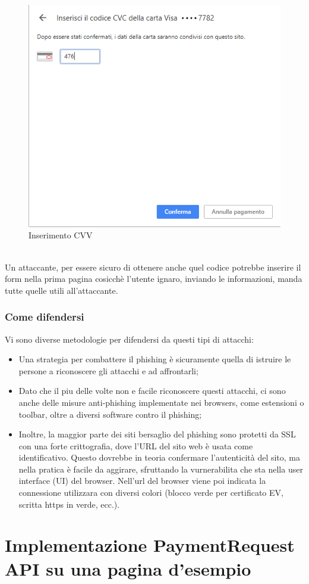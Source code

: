 \documentclass[11pt ,a4paper , twoside , openright ]{article}
\begin{document}
	\begin{figure}[h]
		\centering
		\includegraphics[width=0.5\linewidth]{Chrome2}
		\caption{Inserimento CVV}
		\label{fig: Inserimento CVV}
	\end{figure}
	\pagebreak
	\\
	Un attaccante, per essere sicuro di ottenere anche quel codice potrebbe inserire il form nella prima pagina cosicchè l'utente ignaro, inviando le informazioni, manda tutte quelle utili all'attaccante.
	\subsubsection{Come difendersi}
	Vi sono diverse metodologie per difendersi da questi tipi di attacchi:
	\begin{itemize}
	\item Una strategia per combattere il phishing è sicuramente quella di istruire le persone a riconoscere gli attacchi e ad affrontarli;
	\item Dato che il piu delle volte non e facile riconoscere questi attacchi, ci sono anche delle misure anti-phishing implementate nei browsers, come estensioni o toolbar, oltre a diversi software contro il phishing;
	\item Inoltre, la maggior parte dei siti bersaglio del phishing sono protetti da SSL con una forte crittografia, dove l'URL del sito web è usata come identificativo. Questo dovrebbe in teoria confermare l'autenticità del sito, ma nella pratica è facile da aggirare, sfruttando la vurnerabilita che sta nella user interface (UI) del browser. Nell'url del browser viene poi indicata la connessione utilizzara con diversi colori (blocco verde per certificato EV, scritta https in verde, ecc.).
	\end{itemize}
	\newpage
	\section{Implementazione PaymentRequest API su una pagina d'esempio}
\end{document}
